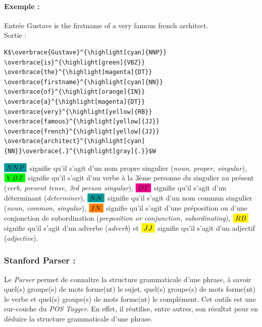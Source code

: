                 \paragraph{Exemple :}
                    Entrée \og Gustave is the firstname of a very famous french architect.\fg\\
                    Sortie :
\begin{lstlisting}
K$\overbrace{Gustave}^{\highlight[cyan]{NNP}} \overbrace{is}^{\highlight[green]{VBZ}} \overbrace{the}^{\highlight[magenta]{DT}} \overbrace{firstname}^{\highlight[cyan]{NN}} \overbrace{of}^{\highlight[orange]{IN}} \overbrace{a}^{\highlight[magenta]{DT}} \overbrace{very}^{\highlight[yellow]{RB}} \overbrace{famous}^{\highlight[yellow]{JJ}} \overbrace{french}^{\highlight[yellow]{JJ}} \overbrace{architect}^{\highlight[cyan]{NN}}\overbrace{.}^{\highlight[gray]{.}}$W
\end{lstlisting}
                \textit{$\highlight[cyan]{NNP}$} signifie qu'il s'agit d'un nom propre singulier (\textit{noun, proper, singular}), \textit{$\highlight[green]{VBZ}$} signifie qu'il s'agit d'un verbe à la 3ème personne du singulier au présent (\textit{verb, present tense, 3rd person singular}), \textit{$\highlight[magenta]{DT}$} signifie qu'il s'agit d'un déterminant (\textit{determiner}), \textit{$\highlight[cyan]{NN}$} signifie qu'il s'agit d'un nom commun singulier (\textit{noun, common, singular}), \textit{$\highlight[orange]{IN}$} signifie qu'il s'agit d'une préposition ou d'une conjonction de subordination (\textit{preposition or conjunction, subordinating}), \textit{$\highlight[yellow]{RB}$} signifie qu'il s'agit d'un adverbe (\textit{adverb}) et \textit{$\highlight[yellow]{JJ}$} signifie qu'il s'agit d'un adjectif (\textit{adjective}).

            \subsubsection{Stanford Parser :}
                Le \textit{Parser} permet de connaître la structure grammaticale d'une phrase, à savoir quel(s) groupe(s) de mots forme(nt) le sujet, quel(s) groupe(s) de mots forme(nt) le verbe et quel(s) groupe(s) de mots forme(nt) le complément. Cet outils est une sur-couche du \textit{POS Tagger}. En effet, il réutilise, entre autres, son résultat pour en déduire la structure grammaticale d'une phrase.

